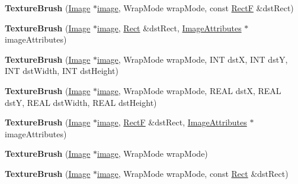 \begin{DoxyCompactItemize}
\item 
\mbox{\label{class_texture_brush_a65051963c5849ba7172df65a7971aedb}} 
{\bfseries Texture\+Brush} (\hyperlink{class_image}{Image} $\ast$\hyperlink{interfacevoid}{image}, Wrap\+Mode wrap\+Mode, const \hyperlink{struct_rect_f}{RectF} \&dst\+Rect)
\item 
\mbox{\label{class_texture_brush_a6f25bcfdb1036696c5286e0d21cfcb71}} 
{\bfseries Texture\+Brush} (\hyperlink{class_image}{Image} $\ast$\hyperlink{interfacevoid}{image}, \hyperlink{struct_rect}{Rect} \&dst\+Rect, \hyperlink{class_image_attributes}{Image\+Attributes} $\ast$image\+Attributes)
\item 
\mbox{\label{class_texture_brush_aee798e3dd336e0468bc117ec7b1fc2be}} 
{\bfseries Texture\+Brush} (\hyperlink{class_image}{Image} $\ast$\hyperlink{interfacevoid}{image}, Wrap\+Mode wrap\+Mode, I\+NT dstX, I\+NT dstY, I\+NT dst\+Width, I\+NT dst\+Height)
\item 
\mbox{\label{class_texture_brush_a2abbe6568d7e6fb44257dfac33af8f34}} 
{\bfseries Texture\+Brush} (\hyperlink{class_image}{Image} $\ast$\hyperlink{interfacevoid}{image}, Wrap\+Mode wrap\+Mode, R\+E\+AL dstX, R\+E\+AL dstY, R\+E\+AL dst\+Width, R\+E\+AL dst\+Height)
\item 
\mbox{\label{class_texture_brush_af9df5f94e91e143d98690c07b047f24a}} 
{\bfseries Texture\+Brush} (\hyperlink{class_image}{Image} $\ast$\hyperlink{interfacevoid}{image}, \hyperlink{struct_rect_f}{RectF} \&dst\+Rect, \hyperlink{class_image_attributes}{Image\+Attributes} $\ast$image\+Attributes)
\item 
\mbox{\label{class_texture_brush_acf6f73c2ffb981b9c2d409d937d973ce}} 
{\bfseries Texture\+Brush} (\hyperlink{class_image}{Image} $\ast$\hyperlink{interfacevoid}{image}, Wrap\+Mode wrap\+Mode)
\item 
\mbox{\label{class_texture_brush_aef6e4f203a90e1abff4949c0b0bc756a}} 
{\bfseries Texture\+Brush} (\hyperlink{class_image}{Image} $\ast$\hyperlink{interfacevoid}{image}, Wrap\+Mode wrap\+Mode, const \hyperlink{struct_rect}{Rect} \&dst\+Rect)

\end{DoxyCompactItemize}
